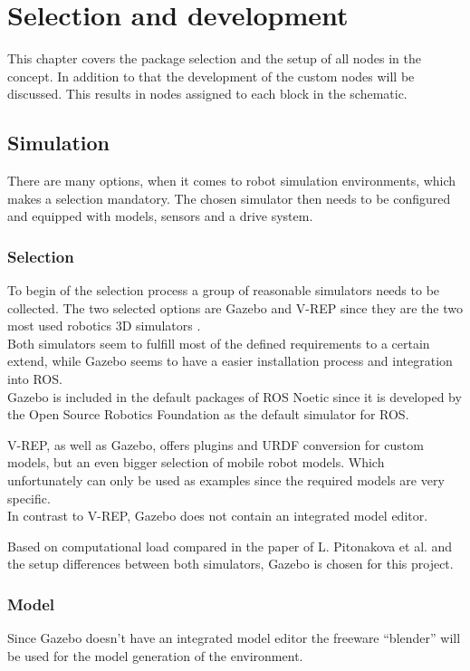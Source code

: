 \chapter{Selection and development}
\label{Selection}

This chapter covers the package selection and the setup of all nodes in the concept. In addition to that the development of the custom nodes will be discussed. This results in nodes assigned to each block in the schematic.


\section{Simulation}
There are many options, when it comes to robot simulation environments, which makes a selection mandatory. The chosen simulator then needs to be configured and equipped with models, sensors and a drive system.

\subsection{Selection}
To begin of the selection process a group of reasonable simulators needs to be collected. The two selected options are Gazebo and V-REP since they are the two most used robotics 3D simulators \cite{SimComp}.\\

Both simulators seem to fulfill most of the defined requirements to a certain extend, while Gazebo seems to have a easier installation process and integration into ROS.\\
Gazebo is included in the default packages of ROS Noetic since it is developed by the Open Source Robotics Foundation as the default simulator for ROS\cite{ROSPkg}.

V-REP, as well as Gazebo, offers plugins and URDF conversion for custom models, but an even bigger selection of mobile robot models. Which unfortunately can only be used as examples since the required models are very specific.\\
In contrast to V-REP, Gazebo does not contain an integrated model editor.

Based on computational load compared in the paper of L. Pitonakova et al. and the setup differences between both simulators, Gazebo is chosen for this project\cite{Pitonakova}.

\subsection{Model}
Since Gazebo doesn't have an integrated model editor the freeware ``blender'' will be used for the model generation of the environment.

